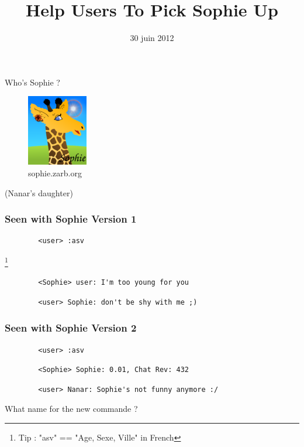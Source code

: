 \documentclass[]{beamer}
\title{Help Users To Pick Sophie Up}
\date{30 juin 2012}
\begin{document}
\frame{\titlepage}

\begin{frame}{Who's Sophie ?}
    \pause
    \begin{figure}\centering
        \includegraphics[width=0.40\linewidth]{../../server/trunk/web/root/static/sophie.png}
        \caption{sophie.zarb.org}
    \end{figure}
    \pause
    \hspace{4cm} (Nanar's daughter)
\end{frame}

\begin{frame}[fragile]\frametitle{Seen with Sophie Version 1}
    \pause
    \begin{verbatim}
        <user> :asv
    \end{verbatim}\footnote{Tip : "asv" == "Age, Sexe, Ville" in French}
    \pause
    \begin{verbatim}
        <Sophie> user: I'm too young for you
    \end{verbatim}
    \pause
    \begin{verbatim}
        <user> Sophie: don't be shy with me ;)
    \end{verbatim}
\end{frame}

\begin{frame}[fragile]\frametitle{Seen with Sophie Version 2}
    \pause
    \begin{verbatim}
        <user> :asv
    \end{verbatim}
    \pause
    \begin{verbatim}
        <Sophie> Sophie: 0.01, Chat Rev: 432
    \end{verbatim}
    \pause
    \begin{verbatim}
        <user> Nanar: Sophie's not funny anymore :/
    \end{verbatim}
\end{frame}
\begin{frame}{What name for the new commande ?}
    \pause
\end{frame}
\end{document}

